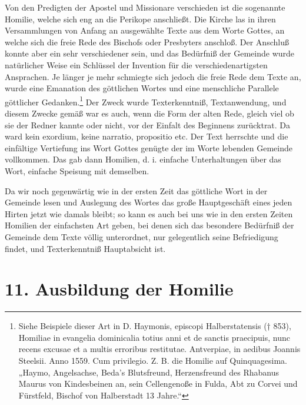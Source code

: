 Von den Predigten der Apostel und Missionare verschieden ist die sogenannte Homilie, welche sich eng an die Perikope anschließt. Die Kirche las in ihren Versammlungen von Anfang an ausgewählte Texte aus dem Worte Gottes, an welche sich die freie Rede des Bischofs oder Presbyters anschloß. Der Anschluß konnte aber ein sehr verschiedener sein, und das Bedürfniß der Gemeinde wurde natürlicher Weise ein Schlüssel der Invention für die verschiedenartigsten Ansprachen. Je länger je mehr schmiegte sich jedoch die freie Rede dem Texte an, wurde eine Emanation des göttlichen Wortes und eine menschliche Parallele göttlicher Gedanken.\footnote{Siehe Beispiele dieser Art in D. Haymonis, episcopi Halberstatensis († 853), Homiliae in evangelia dominicalia totius anni et de sanctis praecipuis, nunc recens excusae et a multis erroribus restitutae. Antverpiae, in aedibus Joannis Steelsii. Anno 1559. Cum privilegio. Z. B. die Homilie auf Quinquagesima. „Haymo, Angelsachse, Beda’s Blutsfreund, Herzensfreund des Rhabanus Maurus von Kindesbeinen an, sein Cellengenoße in Fulda, Abt zu Corvei und Fürstfeld, Bischof von Halberstadt 13 Jahre.“} Der Zweck wurde Texterkenntniß, Textanwendung, und diesem Zwecke gemäß war es auch, wenn die Form der alten Rede, gleich viel ob sie der Redner kannte oder nicht, vor der Einfalt des Beginnens zurücktrat. Da ward kein exordium,
keine narratio, propositio etc. Der Text herrschte und die einfältige Vertiefung ins Wort Gottes genügte der im Worte lebenden Gemeinde vollkommen. Das gab dann Homilien, d. i. einfache Unterhaltungen über das Wort, einfache Speisung mit demselben.

Da wir noch gegenwärtig wie in der ersten Zeit das göttliche Wort in der Gemeinde lesen und Auslegung des Wortes das große Hauptgeschäft eines jeden Hirten jetzt wie damals bleibt; so kann es auch bei uns wie in den ersten Zeiten Homilien der einfachsten Art geben, bei denen sich das besondere Bedürfniß der Gemeinde dem Texte völlig unterordnet, nur gelegentlich seine Befriedigung findet, und Texterkenntniß Hauptabsicht ist.

\section{11. Ausbildung der Homilie}


